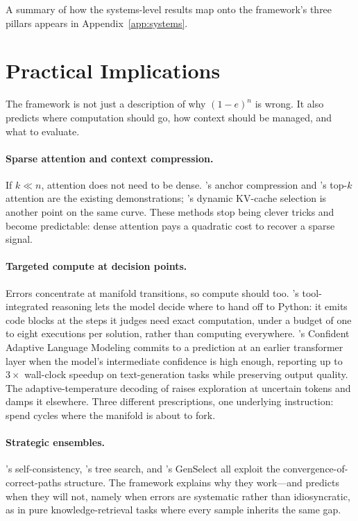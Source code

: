 A summary of how the systems-level results map onto the framework's three pillars appears in Appendix~\ref{app:systems}.

\section{Practical Implications}
\label{sec:implications}

The framework is not just a description of why $(1-e)^n$ is wrong. It also predicts where computation should go, how context should be managed, and what to evaluate.

\paragraph{Sparse attention and context compression.}
If $k \ll n$, attention does not need to be dense. \citet{pang2024anchor}'s anchor compression and \citet{liu2024retrieval}'s top-$k$ attention are the existing demonstrations; \citet{wu2024tokenselect}'s dynamic KV-cache selection is another point on the same curve. These methods stop being clever tricks and become predictable: dense attention pays a quadratic cost to recover a sparse signal.

\paragraph{Targeted compute at decision points.}
Errors concentrate at manifold transitions, so compute should too. \citet{moshkov2025aimo}'s tool-integrated reasoning lets the model decide where to hand off to Python: it emits code blocks at the steps it judges need exact computation, under a budget of one to eight executions per solution, rather than computing everywhere. \citet{schuster2022calm}'s Confident Adaptive Language Modeling commits to a prediction at an earlier transformer layer when the model's intermediate confidence is high enough, reporting up to $3\times$ wall-clock speedup on text-generation tasks while preserving output quality. The adaptive-temperature decoding of \citet{zhu2024hotorcold} raises exploration at uncertain tokens and damps it elsewhere. Three different prescriptions, one underlying instruction: spend cycles where the manifold is about to fork.

\paragraph{Strategic ensembles.}
\citet{wang2023self}'s self-consistency, \citet{yao2023tree}'s tree search, and \citet{moshkov2025aimo}'s GenSelect all exploit the convergence-of-correct-paths structure. The framework explains why they work---and predicts when they will not, namely when errors are systematic rather than idiosyncratic, as in pure knowledge-retrieval tasks where every sample inherits the same gap.

